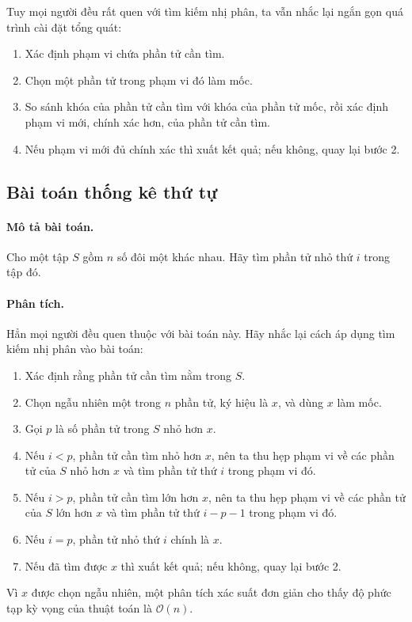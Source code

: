 \documentclass[11pt]{article}
\newcommand{\Oh}{\mathcal{O}}
\begin{document}
Tuy mọi người đều rất quen với tìm kiếm nhị phân, ta vẫn nhắc lại ngắn gọn quá
trình cài đặt tổng quát:
\begin{enumerate}
  \item Xác định phạm vi chứa phần tử cần tìm.
  \item Chọn một phần tử trong phạm vi đó làm mốc.
  \item So sánh khóa của phần tử cần tìm với khóa của phần tử mốc, rồi xác
  định phạm vi mới, chính xác hơn, của phần tử cần tìm.
  \item Nếu phạm vi mới đủ chính xác thì xuất kết quả; nếu không, quay lại
  bước 2.
\end{enumerate}

\subsection{Bài toán thống kê thứ tự}

\paragraph{Mô tả bài toán.}
Cho một tập $S$ gồm $n$ số đôi một khác nhau. Hãy tìm phần tử nhỏ thứ $i$ trong
tập đó.

\paragraph{Phân tích.}
Hẳn mọi người đều quen thuộc với bài toán này. Hãy nhắc lại cách áp dụng tìm
kiếm nhị phân vào bài toán:
\begin{enumerate}
  \item Xác định rằng phần tử cần tìm nằm trong $S$.
  \item Chọn ngẫu nhiên một trong $n$ phần tử, ký hiệu là $x$, và dùng $x$ làm
  mốc.
  \item Gọi $p$ là số phần tử trong $S$ nhỏ hơn $x$.
  \item Nếu $i<p$, phần tử cần tìm nhỏ hơn $x$, nên ta thu hẹp phạm vi về các
  phần tử của $S$ nhỏ hơn $x$ và tìm phần tử thứ $i$ trong phạm vi đó.
  \item Nếu $i>p$, phần tử cần tìm lớn hơn $x$, nên ta thu hẹp phạm vi về các
  phần tử của $S$ lớn hơn $x$ và tìm phần tử thứ $i-p-1$ trong phạm vi đó.
  \item Nếu $i=p$, phần tử nhỏ thứ $i$ chính là $x$.
  \item Nếu đã tìm được $x$ thì xuất kết quả; nếu không, quay lại bước 2.
\end{enumerate}
Vì $x$ được chọn ngẫu nhiên, một phân tích xác suất đơn giản cho thấy độ phức
tạp kỳ vọng của thuật toán là $\Oh(n)$.
\end{document}
